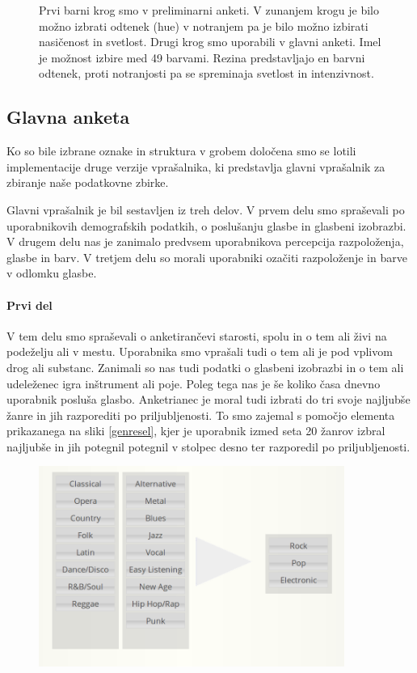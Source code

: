 \documentclass[a4paper, 12pt]{book}
\begin{document}
{\begin{figure}[ht]
\caption{Prvi barni krog smo v preliminarni anketi. V zunanjem krogu je bilo možno izbrati odtenek (hue) v notranjem pa je bilo možno izbirati nasičenost in svetlost. Drugi krog smo uporabili v glavni anketi. Imel je možnost izbire med 49 barvami. Rezina predstavljajo en barvni odtenek, proti notranjosti pa se spreminaja svetlost in intenzivnost. }
\label{colorwheels}
\end{figure}

\subsection{Glavna anketa}

Ko so bile izbrane oznake in struktura v grobem določena smo se lotili implementacije druge verzije vprašalnika, ki predstavlja glavni vprašalnik za zbiranje naše podatkovne zbirke. 

Glavni vprašalnik je bil sestavljen iz treh delov. V prvem delu smo spraševali po uporabnikovih demografskih podatkih, o poslušanju glasbe in glasbeni izobrazbi. V drugem delu nas je zanimalo predvsem uporabnikova percepcija razpoloženja, glasbe in barv. V tretjem delu so morali uporabniki ozačiti razpoloženje in barve v odlomku glasbe. 

\paragraph{Prvi del}

V tem delu smo spraševali o anketirančevi starosti, spolu in o tem ali živi na podeželju ali v mestu. Uporabnika smo vprašali tudi o tem ali je pod vplivom drog ali substanc. Zanimali so nas tudi podatki o glasbeni izobrazbi in o tem ali udeleženec igra inštrument ali poje. Poleg tega nas je še koliko časa dnevno uporabnik posluša glasbo. Anketrianec je moral tudi izbrati do tri svoje najljubše žanre in jih razporediti po priljubljenosti. To smo zajemal s pomočjo elementa prikazanega na sliki \ref{genresel}, kjer je uporabnik izmed seta 20 žanrov izbral najljubše in jih potegnil potegnil v stolpec desno ter razporedil po priljubljenosti. 

\begin{figure}[h!t]
\centering
\includegraphics[width=10cm]{genresel.png}


\end{figure}}
\end{document}

